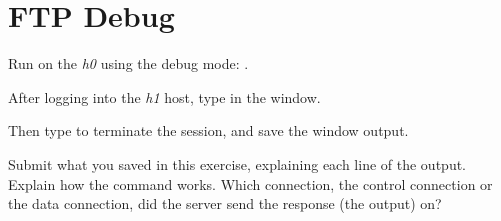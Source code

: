 \documentclass{../UTNetLab}
\begin{document}
\section{FTP Debug}
Run  on the \textit{h0} using the debug mode: .

After logging into the \textit{h1} host, type  in the  window.

Then type  to terminate the  session, and save the  window output.

\begin{report}
    \item Submit what you saved in this exercise, explaining each line of the output.
    Explain how the  command works.
    Which connection, the control connection or the data connection, did the server send the response (the  output) on?
\end{report}
\end{document}
